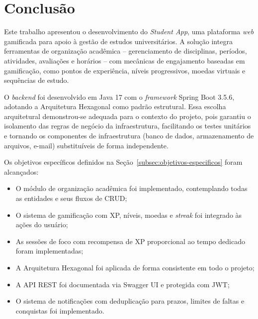 
\chapter{Conclusão}
\label{cap:conclusao}

Este trabalho apresentou o desenvolvimento do \textit{Student App}, uma plataforma
\textit{web} gamificada para apoio à gestão de estudos universitários. A solução
integra ferramentas de organização acadêmica -- gerenciamento de disciplinas,
períodos, atividades, avaliações e horários -- com mecânicas de engajamento
baseadas em gamificação, como pontos de experiência, níveis progressivos, moedas
virtuais e sequências de estudo.

O \textit{backend} foi desenvolvido em Java 17 com o \textit{framework} Spring Boot
3.5.6, adotando a Arquitetura Hexagonal como padrão estrutural. Essa escolha
arquitetural demonstrou-se adequada para o contexto do projeto, pois garantiu o
isolamento das regras de negócio da infraestrutura, facilitando os testes unitários
e tornando os componentes de infraestrutura (banco de dados, armazenamento de
arquivos, e-mail) substituíveis de forma independente.

Os objetivos específicos definidos na Seção~\ref{subsec:objetivos-especificos}
foram alcançados:

\begin{itemize}
  \item O módulo de organização acadêmica foi implementado, contemplando todas as
        entidades e seus fluxos de CRUD;

  \item O sistema de gamificação com XP, níveis, moedas e \textit{streak} foi
        integrado às ações do usuário;

  \item As sessões de foco com recompensa de XP proporcional ao tempo dedicado
        foram implementadas;

  \item A Arquitetura Hexagonal foi aplicada de forma consistente em todo o projeto;

  \item A API REST foi documentada via Swagger UI e protegida com JWT;

  \item O sistema de notificações com deduplicação para prazos, limites de faltas
        e conquistas foi implementado.
\end{itemize}

